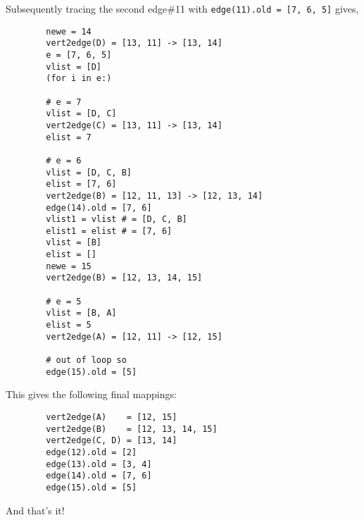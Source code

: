     Subsequently tracing the second edge\#11 with {\tt edge(11).old = [7, 6, 5]} gives,
    \begin{lstlisting}
        newe = 14
        vert2edge(D) = [13, 11] -> [13, 14]
        e = [7, 6, 5]
        vlist = [D]
        (for i in e:)

        # e = 7
        vlist = [D, C]
        vert2edge(C) = [13, 11] -> [13, 14]
        elist = 7

        # e = 6
        vlist = [D, C, B]
        elist = [7, 6]
        vert2edge(B) = [12, 11, 13] -> [12, 13, 14]
        edge(14).old = [7, 6]
        vlist1 = vlist # = [D, C, B]
        elist1 = elist # = [7, 6]
        vlist = [B]
        elist = []
        newe = 15
        vert2edge(B) = [12, 13, 14, 15]

        # e = 5
        vlist = [B, A]
        elist = 5
        vert2edge(A) = [12, 11] -> [12, 15]

        # out of loop so
        edge(15).old = [5]
    \end{lstlisting}
    This gives the following final mappings:
    \begin{lstlisting}
        vert2edge(A)    = [12, 15]
        vert2edge(B)    = [12, 13, 14, 15]
        vert2edge(C, D) = [13, 14]
        edge(12).old = [2]
        edge(13).old = [3, 4]
        edge(14).old = [7, 6]
        edge(15).old = [5]
    \end{lstlisting}
    And that's it!


